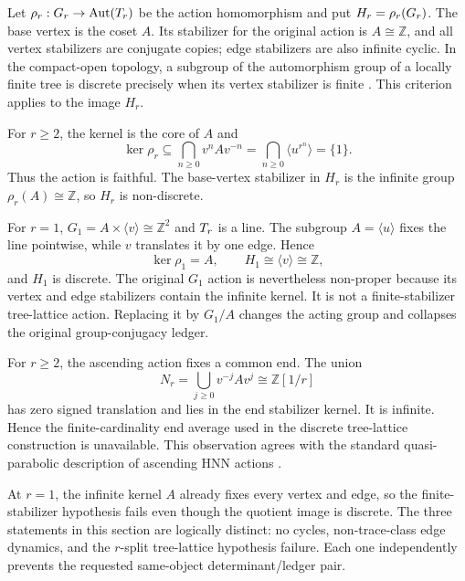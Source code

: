 Let $\rho_r:G_r\to\operatorname{Aut}(T_r)$ be the action homomorphism and put
$H_r=\rho_r(G_r)$.  The base vertex is the coset $A$.  Its stabilizer for the
original action is $A\cong\mathbb Z$, and all vertex stabilizers are conjugate
copies; edge stabilizers are also infinite cyclic.  In the compact-open
topology, a subgroup of the automorphism group of a locally finite tree is
discrete precisely when its vertex stabilizer is finite
\citep{clair2001zeta}.  This criterion applies to the image $H_r$.

For $r\ge2$, the kernel is the core of $A$ and
\[
  \ker\rho_r\subseteq
  \bigcap_{n\ge0}v^nAv^{-n}
  =\bigcap_{n\ge0}\langle u^{r^n}\rangle=\{1\}.
\]
Thus the action is faithful.  The base-vertex stabilizer in $H_r$ is the
infinite group $\rho_r(A)\cong\mathbb Z$, so $H_r$ is non-discrete.

For $r=1$, $G_1=A\times\langle v\rangle\cong\mathbb Z^2$ and $T_r$ is a
line.  The subgroup $A=\langle u\rangle$ fixes the line pointwise, while $v$
translates it by one edge.  Hence
\[
  \ker\rho_1=A,
  \qquad H_1\cong\langle v\rangle\cong\mathbb Z,
\]
and $H_1$ is discrete.  The original $G_1$ action is nevertheless non-proper
because its vertex and edge stabilizers contain the infinite kernel.  It is
not a finite-stabilizer tree-lattice action.  Replacing it by $G_1/A$ changes
the acting group and collapses the original group-conjugacy ledger.

For $r\ge2$, the ascending action fixes a common end.  The union
\begin{equation}
  N_r=\bigcup_{j\ge0}v^{-j}Av^j\cong\mathbb Z[1/r]
  \label{eq:end-kernel}
\end{equation}
has zero signed translation and lies in the end stabilizer kernel.  It is
infinite.  Hence the finite-cardinality end average used in the discrete
tree-lattice construction is unavailable.  This observation agrees with the
standard quasi-parabolic description of ascending HNN actions
\citep{fima2022transitivity}.

At $r=1$, the infinite kernel $A$ already fixes every vertex and edge, so the
finite-stabilizer hypothesis fails even though the quotient image is
discrete.  The three statements in this section are logically distinct: no
cycles, non-trace-class edge dynamics, and the $r$-split tree-lattice
hypothesis failure.  Each one independently prevents the requested
same-object determinant/ledger pair.
